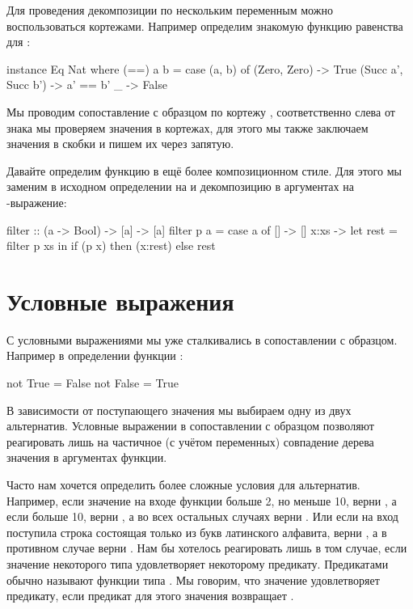 Для проведения декомпозиции по нескольким переменным можно
воспользоваться кортежами. Например определим знакомую функцию равенства
для :


\begin{code}
instance Eq Nat where
    (==) a b =
        case (a, b) of
            (Zero,    Zero)     -> True
            (Succ a', Succ b')  -> a' == b'
            _                   -> False
\end{code}

Мы проводим сопоставление с образцом по кортежу ,
соответственно слева от знака \In{->} мы проверяем значения в кортежах,
для этого мы также заключаем значения в скобки и пишем их через запятую.

Давайте определим функцию  в ещё более композиционном стиле.
Для этого мы заменим в исходном определении  на  и
декомпозицию в аргументах на -выражение:


\begin{code}
filter :: (a -> Bool) -> [a] -> [a]
filter  p  a = 
    case a of
        []      -> []
        x:xs    ->  let rest = filter p xs
                    in  if (p x) 
                        then (x:rest)
                        else rest
\end{code}

\section{Условные выражения}

С условными выражениями мы уже сталкивались в сопоставлении с образцом.
Например в определении функции :


\begin{code}
not True  = False
not False = True
\end{code}

В зависимости от поступающего значения мы выбираем одну из двух
альтернатив. Условные выражении в сопоставлении с образцом позволяют
реагировать лишь на частичное (с учётом переменных) совпадение дерева
значения в аргументах функции.

Часто нам хочется определить более сложные условия для альтернатив.
Например, если значение на входе функции больше 2, но меньше 10, верни
, а если больше 10, верни , а во всех остальных случаях
верни . Или если на вход поступила строка состоящая только из букв
латинского алфавита, верни , а в противном случае верни .
Нам бы хотелось реагировать лишь в том случае, если значение некоторого
типа  удовлетворяет некоторому предикату. Предикатами обычно
называют функции типа . Мы говорим, что значение
удовлетворяет предикату, если предикат для этого значения возвращает
.

